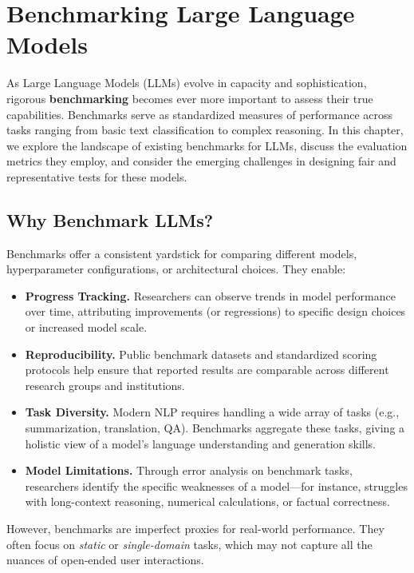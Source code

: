 \chapter{Benchmarking Large Language Models}
\label{chap:benchmarking_llms}

\noindent
As Large Language Models (LLMs) evolve in capacity and sophistication, rigorous \textbf{benchmarking} becomes ever more important to assess their true capabilities. Benchmarks serve as standardized measures of performance across tasks ranging from basic text classification to complex reasoning. In this chapter, we explore the landscape of existing benchmarks for LLMs, discuss the evaluation metrics they employ, and consider the emerging challenges in designing fair and representative tests for these models.

\section{Why Benchmark LLMs?}
\noindent
Benchmarks offer a consistent yardstick for comparing different models, hyperparameter configurations, or architectural choices. They enable:
\begin{itemize}
    \item \textbf{Progress Tracking.} Researchers can observe trends in model performance over time, attributing improvements (or regressions) to specific design choices or increased model scale.
    \item \textbf{Reproducibility.} Public benchmark datasets and standardized scoring protocols help ensure that reported results are comparable across different research groups and institutions.
    \item \textbf{Task Diversity.} Modern NLP requires handling a wide array of tasks (e.g., summarization, translation, QA). Benchmarks aggregate these tasks, giving a holistic view of a model’s language understanding and generation skills.
    \item \textbf{Model Limitations.} Through error analysis on benchmark tasks, researchers identify the specific weaknesses of a model—for instance, struggles with long-context reasoning, numerical calculations, or factual correctness.
\end{itemize}

\noindent
However, benchmarks are imperfect proxies for real-world performance. They often focus on \emph{static} or \emph{single-domain} tasks, which may not capture all the nuances of open-ended user interactions.

